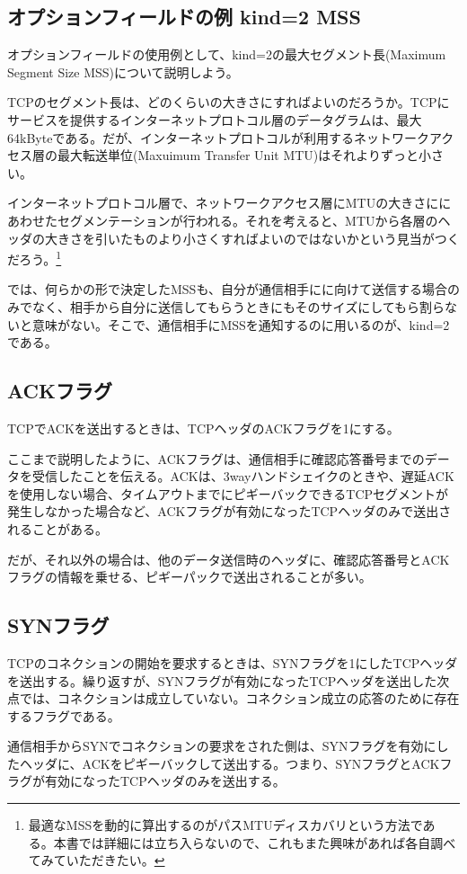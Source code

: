 \subsection{オプションフィールドの例 kind=2 MSS}
オプションフィールドの使用例として、kind=2の最大セグメント長(Maximum Segment Size MSS)について説明しよう。

TCPのセグメント長は、どのくらいの大きさにすればよいのだろうか。TCPにサービスを提供するインターネットプロトコル層のデータグラムは、最大64kByteである。だが、インターネットプロトコルが利用するネットワークアクセス層の最大転送単位(Maxuimum Transfer Unit MTU)はそれよりずっと小さい。

インターネットプロトコル層で、ネットワークアクセス層にMTUの大きさににあわせたセグメンテーションが行われる。それを考えると、MTUから各層のヘッダの大きさを引いたものより小さくすればよいのではないかという見当がつくだろう。\footnote{最適なMSSを動的に算出するのがパスMTUディスカバリという方法である。本書では詳細には立ち入らないので、これもまた興味があれば各自調べてみていただきたい。}

では、何らかの形で決定したMSSも、自分が通信相手にに向けて送信する場合のみでなく、相手から自分に送信してもらうときにもそのサイズにしてもら割らないと意味がない。そこで、通信相手にMSSを通知するのに用いるのが、kind=2である。

\subsection{ACKフラグ}
TCPでACKを送出するときは、TCPヘッダのACKフラグを1にする。

ここまで説明したように、ACKフラグは、通信相手に確認応答番号までのデータを受信したことを伝える。ACKは、3wayハンドシェイクのときや、遅延ACKを使用しない場合、タイムアウトまでにピギーバックできるTCPセグメントが発生しなかった場合など、ACKフラグが有効になったTCPヘッダのみで送出されることがある。

だが、それ以外の場合は、他のデータ送信時のヘッダに、確認応答番号とACKフラグの情報を乗せる、ピギーパックで送出されることが多い。

\subsection{SYNフラグ}
TCPのコネクションの開始を要求するときは、SYNフラグを1にしたTCPヘッダを送出する。繰り返すが、SYNフラグが有効になったTCPヘッダを送出した次点では、コネクションは成立していない。コネクション成立の応答のために存在するフラグである。

通信相手からSYNでコネクションの要求をされた側は、SYNフラグを有効にしたヘッダに、ACKをピギーバックして送出する。つまり、SYNフラグとACKフラグが有効になったTCPヘッダのみを送出する。


